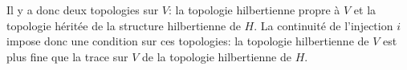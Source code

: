 \medskip
Il y a donc deux topologies sur $V$: la topologie hilbertienne propre à $V$ et la topologie héritée de la structure hilbertienne de $H$.
La continuité de l'injection $i$ impose donc une condition sur ces topologies: la topologie hilbertienne de $V$ est plus fine que la trace sur $V$ de la topologie hilbertienne de $H$.

\medskip
{} 
